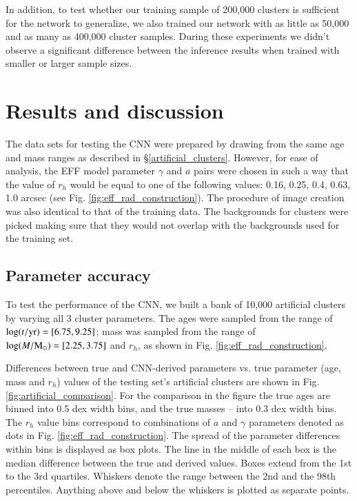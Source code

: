 \documentclass{aa}
\begin{document}
In addition, to test whether our training sample of 200,000 clusters is sufficient for the network to generalize, we also trained our network with as little as 50,000 and as many as 400,000 cluster samples. During these experiments we didn’t observe a significant difference between the inference results when trained with smaller or larger sample sizes.

\section{Results and discussion} \label{sec:results}
The data sets for testing the CNN were prepared by drawing from the same age and mass ranges as described in \S \ref{artificial_clusters}. However, for ease of analysis, the EFF model parameter $\gamma$ and $a$ pairs were chosen in such a way that the value of $r_h$ would be equal to one of the following values: 0.16, 0.25, 0.4, 0.63, 1.0 arcsec (see Fig. \ref{fig:eff_rad_construction}). The procedure of image creation was also identical to that of the training data. The backgrounds for clusters were picked making sure that they would not overlap with the backgrounds used for the training set.

\subsection{Parameter accuracy}
To test the performance of the CNN, we built a bank of 10,000 artificial clusters by varying all 3 cluster parameters. The ages were sampled from the range of $\log(t/{\rm yr})=[6.75, 9.25]$; mass was sampled from the range of  $\log(M/{\rm M_\odot})=[2.25, 3.75]$ and $r_h$, as shown in Fig. \ref{fig:eff_rad_construction}.

Differences between true and CNN-derived parameters vs. true parameter (age, mass and $r_h$) values of the testing set's artificial clusters are shown in Fig. \ref{fig:artificial_comparison}. For the comparison in the figure the true ages are binned into 0.5 dex width bins, and the true masses -- into 0.3 dex width bins. The $r_h$ value bins correspond to combinations of $a$ and $\gamma$ parameters denoted as dots in Fig. \ref{fig:eff_rad_construction}. The spread of the parameter differences within bins is displayed as box plots. The line in the middle of each box is the median difference between the true and derived values. Boxes extend from the 1st to the 3rd quartiles. Whiskers denote the range between the 2nd and the 98th percentiles. Anything above and below the whiskers is plotted as separate points.
\end{document}
